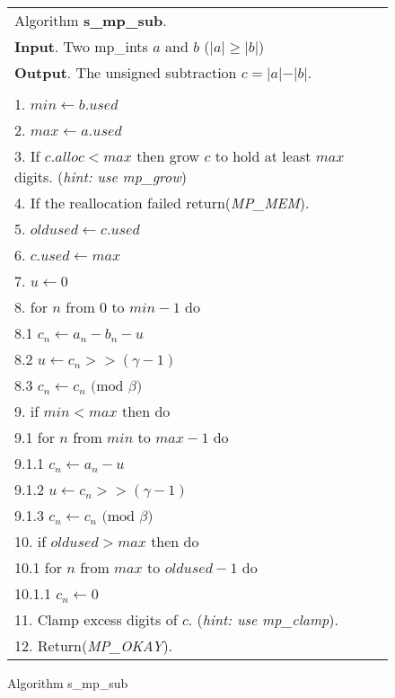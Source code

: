 \documentclass[b5paper]{book}
\begin{document}
\newpage\begin{figure}[!here]
\begin{center}
\begin{small}
\begin{tabular}{l}
\hline Algorithm \textbf{s\_mp\_sub}. \\
\textbf{Input}.   Two mp\_ints $a$ and $b$ ($\vert a \vert \ge \vert b \vert$) \\
\textbf{Output}.  The unsigned subtraction $c = \vert a \vert - \vert b \vert$. \\
\hline \\
1.  $min \leftarrow b.used$ \\
2.  $max \leftarrow a.used$ \\
3.  If $c.alloc < max$ then grow $c$ to hold at least $max$ digits.  (\textit{hint: use mp\_grow}) \\
4.  If the reallocation failed return(\textit{MP\_MEM}). \\
5.  $oldused \leftarrow c.used$ \\ 
6.  $c.used \leftarrow max$ \\
7.  $u \leftarrow 0$ \\
8.  for $n$ from $0$ to $min - 1$ do \\
\hspace{3mm}8.1  $c_n \leftarrow a_n - b_n - u$ \\
\hspace{3mm}8.2  $u   \leftarrow c_n >> (\gamma - 1)$ \\
\hspace{3mm}8.3  $c_n \leftarrow c_n \mbox{ (mod }\beta\mbox{)}$ \\
9.  if $min < max$ then do \\
\hspace{3mm}9.1  for $n$ from $min$ to $max - 1$ do \\
\hspace{6mm}9.1.1  $c_n \leftarrow a_n - u$ \\
\hspace{6mm}9.1.2  $u   \leftarrow c_n >> (\gamma - 1)$ \\
\hspace{6mm}9.1.3  $c_n \leftarrow c_n \mbox{ (mod }\beta\mbox{)}$ \\
10. if $oldused > max$ then do \\
\hspace{3mm}10.1  for $n$ from $max$ to $oldused - 1$ do \\
\hspace{6mm}10.1.1  $c_n \leftarrow 0$ \\
11. Clamp excess digits of $c$.  (\textit{hint: use mp\_clamp}). \\
12. Return(\textit{MP\_OKAY}). \\
\hline
\end{tabular}
\end{small}
\end{center}
\caption{Algorithm s\_mp\_sub}
\end{figure}
\end{document}
